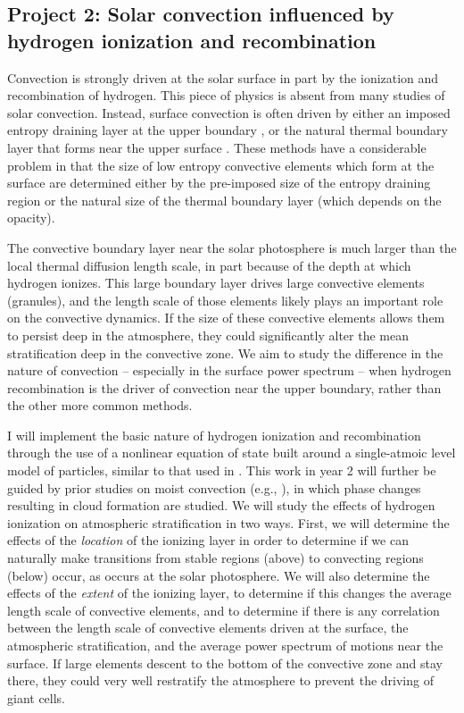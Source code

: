 \documentclass[aasms,12pt]{article}
\begin{document}
\vspace{-0.25cm}
\subsection{Project 2: Solar convection influenced by hydrogen ionization and recombination}
\vspace{-0.15cm}
Convection is strongly driven at the solar surface in part by the ionization and recombination of hydrogen.
This piece of physics is absent from many studies of solar convection. Instead, surface convection
is often driven by either an imposed entropy draining layer at the upper boundary \citep{kapyla&all2017}, 
or the natural thermal boundary layer that forms near the upper surface \citep{anders&brown2017}.
These methods have a considerable problem in that the size of low entropy
convective elements which form at the surface are determined either by the pre-imposed size of the
entropy draining region or the natural size of the thermal boundary layer (which depends on
the opacity).

The convective boundary layer near the solar photosphere is much larger than the local thermal
diffusion length scale, in part because of the depth at which hydrogen ionizes. This large boundary
layer drives large convective elements (granules), and the length scale of those elements likely
plays an important role on the convective dynamics. 
If the size of these convective elements allows them to persist deep in the atmosphere, they could significantly alter the
mean stratification deep in the convective zone.  We aim to study the difference in the 
nature of convection -- especially in the surface power spectrum -- when hydrogen recombination
is the driver of convection near the upper boundary, rather than the other more common methods.

I will implement the basic nature of hydrogen ionization and recombination through the use of
a nonlinear equation of state built around a single-atmoic level model of particles,
similar to that used in \cite{rast&toomre1993}.
This work in year 2 will further be guided by prior studies on moist convection (e.g., \citet{leconte&all2017}),
in which phase changes resulting in cloud formation are studied. We will study the effects of
hydrogen ionization on atmospheric stratification in two ways.  First, we will determine the effects of the
\emph{location} of the ionizing layer in order to determine if we can naturally make transitions from
stable regions (above) to convecting regions (below) occur, as occurs at the solar photosphere.  
We will also determine
the effects of the \emph{extent} of the ionizing layer, to determine if this changes the average length
scale of convective elements, and to determine if there is any correlation between the length scale of convective
elements driven at the surface, the atmospheric stratification, and the average power spectrum of motions near the
surface. If large elements descent to the bottom of the convective zone and stay there, they could very
well restratify the atmosphere to prevent the driving of giant cells.
\end{document}
